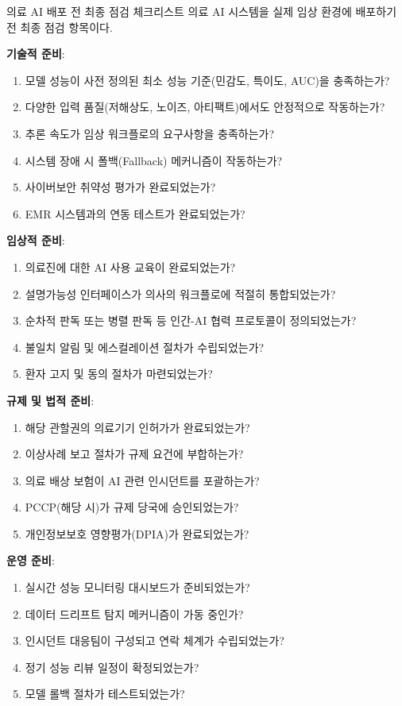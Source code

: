 \begin{practicaltool}{의료 AI 배포 전 최종 점검 체크리스트}
의료 AI 시스템을 실제 임상 환경에 배포하기 전 최종 점검 항목이다.

\textbf{기술적 준비}:
\begin{enumerate}
 \item 모델 성능이 사전 정의된 최소 성능 기준(민감도, 특이도, AUC)을 충족하는가?
 \item 다양한 입력 품질(저해상도, 노이즈, 아티팩트)에서도 안정적으로 작동하는가?
 \item 추론 속도가 임상 워크플로의 요구사항을 충족하는가?
 \item 시스템 장애 시 폴백(Fallback) 메커니즘이 작동하는가?
 \item 사이버보안 취약성 평가가 완료되었는가?
 \item EMR 시스템과의 연동 테스트가 완료되었는가?
\end{enumerate}

\textbf{임상적 준비}:
\begin{enumerate}
 \item 의료진에 대한 AI 사용 교육이 완료되었는가?
 \item 설명가능성 인터페이스가 의사의 워크플로에 적절히 통합되었는가?
 \item 순차적 판독 또는 병렬 판독 등 인간-AI 협력 프로토콜이 정의되었는가?
 \item 불일치 알림 및 에스컬레이션 절차가 수립되었는가?
 \item 환자 고지 및 동의 절차가 마련되었는가?
\end{enumerate}

\textbf{규제 및 법적 준비}:
\begin{enumerate}
 \item 해당 관할권의 의료기기 인허가가 완료되었는가?
 \item 이상사례 보고 절차가 규제 요건에 부합하는가?
 \item 의료 배상 보험이 AI 관련 인시던트를 포괄하는가?
 \item PCCP(해당 시)가 규제 당국에 승인되었는가?
 \item 개인정보보호 영향평가(DPIA)가 완료되었는가?
\end{enumerate}

\textbf{운영 준비}:
\begin{enumerate}
 \item 실시간 성능 모니터링 대시보드가 준비되었는가?
 \item 데이터 드리프트 탐지 메커니즘이 가동 중인가?
 \item 인시던트 대응팀이 구성되고 연락 체계가 수립되었는가?
 \item 정기 성능 리뷰 일정이 확정되었는가?
 \item 모델 롤백 절차가 테스트되었는가?
\end{enumerate}
\end{practicaltool}

